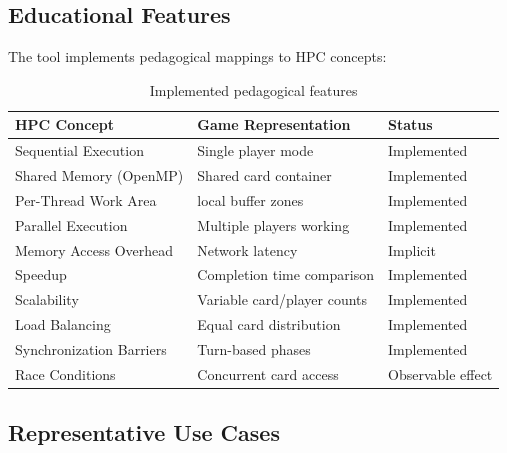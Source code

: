 \subsection{Educational Features}
\label{subsec:educational-features}

The tool implements pedagogical mappings to HPC concepts:

\begin{table}[htbp]
    \centering
    \caption{Implemented pedagogical features}
    \label{tab:implemented-pedagogical}
    \begin{tabular}{@{}lll@{}}
        \toprule
        \textbf{HPC Concept}     & \textbf{Game Representation} & \textbf{Status}   \\
        \midrule
        Sequential Execution     & Single player mode           & Implemented       \\
        Shared Memory (OpenMP)   & Shared card container        & Implemented       \\
        Per-Thread Work Area     & local buffer zones           & Implemented       \\
        Parallel Execution       & Multiple players working     & Implemented       \\
        Memory Access Overhead   & Network latency              & Implicit          \\
        Speedup                  & Completion time comparison   & Implemented       \\
        Scalability              & Variable card/player counts  & Implemented       \\
        Load Balancing           & Equal card distribution      & Implemented       \\
        Synchronization Barriers & Turn-based phases            & Implemented       \\
        Race Conditions          & Concurrent card access       & Observable effect \\
        \bottomrule
    \end{tabular}
\end{table}


\subsection{Representative Use Cases}
\label{subsec:use-cases}

